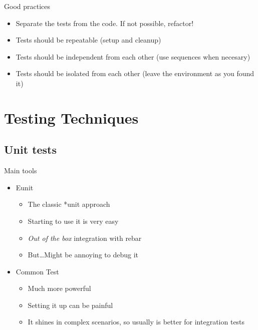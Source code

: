 \documentclass[pdf]{beamer}
\begin{document}
\begin{frame}{Good practices}
    \begin{itemize}
    \item Separate the tests from the code. If not possible, refactor!
    \pause
    \item Tests should be repeatable (setup and cleanup)
    \pause
    \item Tests should be independent from each other (use sequences when necesary)
    \pause
    \item Tests should be isolated from each other (leave the environment as you found it)
    \end{itemize}
\end{frame}



\section{Testing Techniques}

\subsection*{Unit tests}
\label{unit_testing}

\begin{frame}{Main tools}
    \begin{itemize}
    \item Eunit
        \begin{itemize}
        \item The classic *unit approach
        \pause
        \item Starting to use it is very easy
        \pause
        \item \emph{Out of the box} integration with rebar
        \pause
        \item But\dots Might be annoying to debug it
        \end{itemize}
    \pause
    \item Common Test
        \begin{itemize}
        \item Much more powerful
        \pause
        \item Setting it up can be painful
        \pause
        \item It shines in complex scenarios, so usually is better for integration tests
        \end{itemize}
    \end{itemize}
\end{frame}
\end{document}
